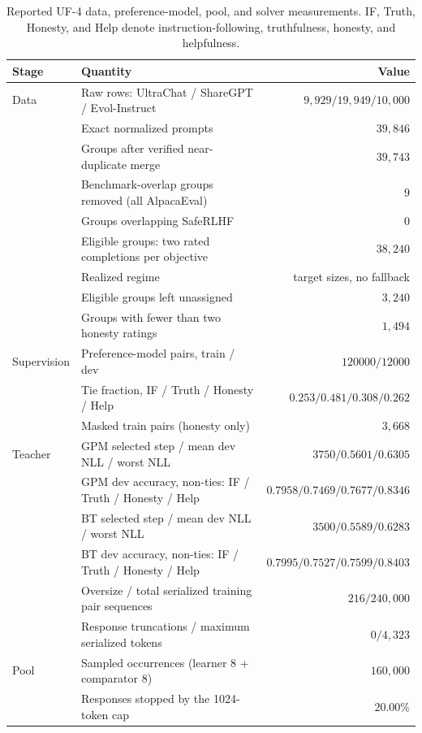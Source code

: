 \documentclass{article}
\theoremstyle{remark}
\theoremstyle{plain}
\begin{document}
\begin{table}[t]
\centering\scriptsize
\setlength{\tabcolsep}{3pt}
\caption{Reported UF-4 data, preference-model, pool, and solver measurements. IF, Truth, Honesty, and Help denote instruction-following, truthfulness, honesty, and helpfulness.}
\label{tab:uf4-realized}
\begin{tabular}{@{}p{}p{}r@{}}
\toprule
Stage & Quantity & Value\\
\midrule
Data & Raw rows: UltraChat / ShareGPT / Evol-Instruct & $9{,}929 / 19{,}949 / 10{,}000$\\
 & Exact normalized prompts & $39{,}846$\\
 & Groups after verified near-duplicate merge & $39{,}743$\\
 & Benchmark-overlap groups removed (all AlpacaEval) & $9$\\
 & Groups overlapping SafeRLHF & $0$\\
 & Eligible groups: two rated completions per objective & $38{,}240$\\
 & Realized regime & \textrm{target sizes, no fallback}\\
 & Eligible groups left unassigned & $3{,}240$\\
 & Groups with fewer than two honesty ratings & $1{,}494$\\
Supervision & Preference-model pairs, train / dev & $120000 / 12000$\\
 & Tie fraction, IF / Truth / Honesty / Help & $0.253 / 0.481 / 0.308 / 0.262$\\
 & Masked train pairs (honesty only) & $3{,}668$\\
Teacher & GPM selected step / mean dev NLL / worst NLL & $3750 / 0.5601 / 0.6305$\\
 & GPM dev accuracy, non-ties: IF / Truth / Honesty / Help & $0.7958 / 0.7469 / 0.7677 / 0.8346$\\
 & BT selected step / mean dev NLL / worst NLL & $3500 / 0.5589 / 0.6283$\\
 & BT dev accuracy, non-ties: IF / Truth / Honesty / Help & $0.7995 / 0.7527 / 0.7599 / 0.8403$\\
 & Oversize / total serialized training pair sequences & $216 / 240{,}000$\\
 & Response truncations / maximum serialized tokens & $0 / 4{,}323$\\
Pool & Sampled occurrences (learner 8 + comparator 8) & $160{,}000$\\
 & Responses stopped by the 1024-token cap & $20.00\%$\\

\end{tabular}
\end{table}
\end{document}
